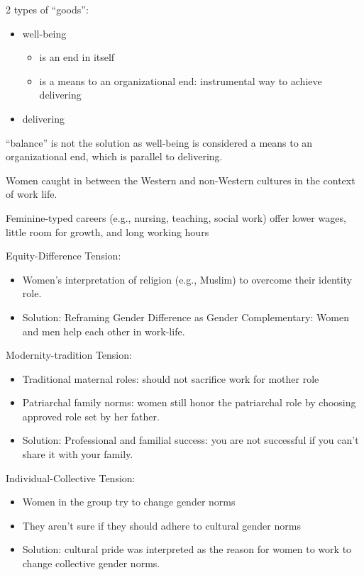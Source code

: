 \documentclass[
]{book}
\providecommand{\tightlist}{%
  \setlength{\itemsep}{0pt}\setlength{\parskip}{0pt}}
\begin{document}
2 types of ``goods'':

\begin{itemize}
\item
  well-being

  \begin{itemize}
  \item
    is an end in itself
  \item
    is a means to an organizational end: instrumental way to achieve delivering
  \end{itemize}
\item
  delivering
\end{itemize}

``balance'' is not the solution as well-being is considered a means to an organizational end, which is parallel to
delivering.

\citep{D_Enbeau_2015}

Women caught in between the Western and non-Western cultures in the context of work life.

Feminine-typed careers (e.g., nursing, teaching, social work) offer lower wages, little room for growth, and long
working hours

Equity-Difference Tension:

\begin{itemize}
\tightlist
\item
  Women's interpretation of religion (e.g., Muslim) to overcome their identity role.
\item
  Solution: Reframing Gender Difference as Gender Complementary: Women and men help each other in work-life.
\end{itemize}

Modernity-tradition Tension:

\begin{itemize}
\tightlist
\item
  Traditional maternal roles: should not sacrifice work for mother role
\item
  Patriarchal family norms: women still honor the patriarchal role by choosing approved role set by her father.
\item
  Solution: Professional and familial success: you are not successful if you can't share it with your family.
\end{itemize}

Individual-Collective Tension:

\begin{itemize}
\tightlist
\item
  Women in the group try to change gender norms
\item
  They aren't sure if they should adhere to cultural gender norms
\item
  Solution: cultural pride was interpreted as the reason for women to work to change collective gender norms.
\end{itemize}
\end{document}
